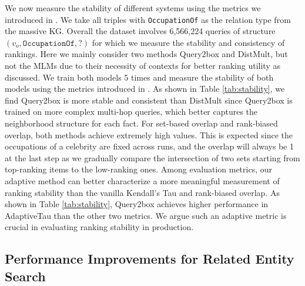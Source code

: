 We now measure the stability of different systems using the metrics we introduced in .
We take all triples with \texttt{OccupationOf} as the relation type from the massive KG. Overall the dataset involves 6,566,224 queries of structure $(v_o, \texttt{OccupationOf}, ?)$ for which we measure the stability and consistency of rankings. 
Here we mainly consider two methods Query2box and DistMult, but not the MLMs due to their necessity of contexts for better ranking utility as discussed.
We train both models 5 times and measure the stability of both models using the metrics introduced in .
As shown in Table \ref{tab:stability}, we find Query2box is more stable and consistent than DistMult since Query2box is trained on more complex multi-hop queries, which better captures the neighborhood structure for each fact.
For set-based overlap and rank-biased overlap, both methods achieve extremely high values. This is expected since the occupations of a celebrity are fixed across runs, and the overlap will always be 1 at the last step as we gradually compare the intersection of two sets starting from top-ranking items to the low-ranking ones.
Among evaluation metrics, our adaptive method can better characterize a more meaningful measurement of ranking stability than the vanilla Kendall's Tau and rank-biased overlap. As shown in Table \ref{tab:stability}, Query2box achieves higher performance in AdaptiveTau than the other two metrics. We argue such an adaptive metric is crucial in evaluating ranking stability in production. %

\iffalse
\subsection{Performance  Improvements for Related Entity Search}

